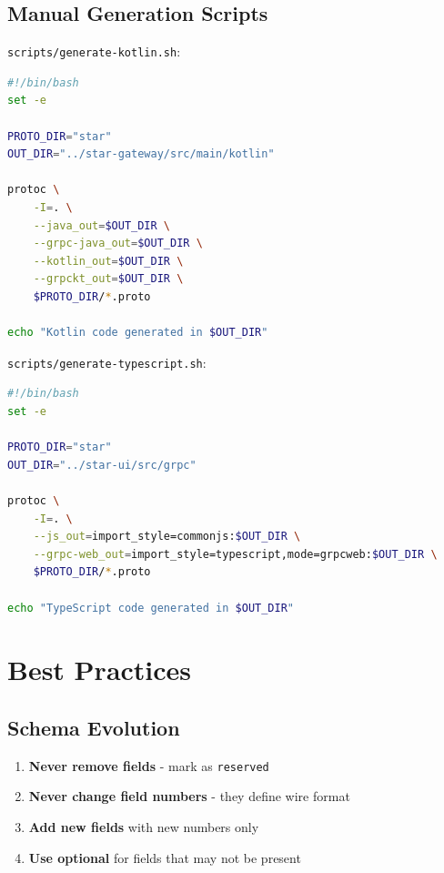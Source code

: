 \documentclass[11pt,letterpaper]{article}
\begin{document}
\subsection{Manual Generation Scripts}

\texttt{scripts/generate-kotlin.sh}:

\begin{lstlisting}[language=bash, caption=generate-kotlin.sh]
#!/bin/bash
set -e

PROTO_DIR="star"
OUT_DIR="../star-gateway/src/main/kotlin"

protoc \
    -I=. \
    --java_out=$OUT_DIR \
    --grpc-java_out=$OUT_DIR \
    --kotlin_out=$OUT_DIR \
    --grpckt_out=$OUT_DIR \
    $PROTO_DIR/*.proto

echo "Kotlin code generated in $OUT_DIR"
\end{lstlisting}

\texttt{scripts/generate-typescript.sh}:

\begin{lstlisting}[language=bash, caption=generate-typescript.sh]
#!/bin/bash
set -e

PROTO_DIR="star"
OUT_DIR="../star-ui/src/grpc"

protoc \
    -I=. \
    --js_out=import_style=commonjs:$OUT_DIR \
    --grpc-web_out=import_style=typescript,mode=grpcweb:$OUT_DIR \
    $PROTO_DIR/*.proto

echo "TypeScript code generated in $OUT_DIR"
\end{lstlisting}

\section{Best Practices}

\subsection{Schema Evolution}

\begin{enumerate}
    \item \textbf{Never remove fields} - mark as \texttt{reserved}
    \item \textbf{Never change field numbers} - they define wire format
    \item \textbf{Add new fields} with new numbers only
    \item \textbf{Use optional} for fields that may not be present
\end{enumerate}
\end{document}
